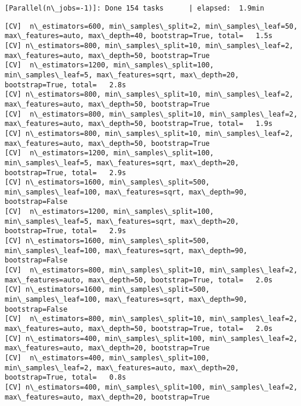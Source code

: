 \documentclass[11pt]{article}
\begin{document}
\begin{Verbatim}[commandchars=\\\{\}]
    \end{Verbatim}

    \begin{Verbatim}[commandchars=\\\{\}]
[Parallel(n\_jobs=-1)]: Done 154 tasks      | elapsed:  1.9min

    \end{Verbatim}

    \begin{Verbatim}[commandchars=\\\{\}]
[CV]  n\_estimators=600, min\_samples\_split=2, min\_samples\_leaf=50, max\_features=auto, max\_depth=40, bootstrap=True, total=   1.5s
[CV] n\_estimators=800, min\_samples\_split=10, min\_samples\_leaf=2, max\_features=auto, max\_depth=50, bootstrap=True 
[CV]  n\_estimators=1200, min\_samples\_split=100, min\_samples\_leaf=5, max\_features=sqrt, max\_depth=20, bootstrap=True, total=   2.8s
[CV] n\_estimators=800, min\_samples\_split=10, min\_samples\_leaf=2, max\_features=auto, max\_depth=50, bootstrap=True 
[CV]  n\_estimators=800, min\_samples\_split=10, min\_samples\_leaf=2, max\_features=auto, max\_depth=50, bootstrap=True, total=   1.9s
[CV] n\_estimators=800, min\_samples\_split=10, min\_samples\_leaf=2, max\_features=auto, max\_depth=50, bootstrap=True 
[CV]  n\_estimators=1200, min\_samples\_split=100, min\_samples\_leaf=5, max\_features=sqrt, max\_depth=20, bootstrap=True, total=   2.9s
[CV] n\_estimators=1600, min\_samples\_split=500, min\_samples\_leaf=100, max\_features=sqrt, max\_depth=90, bootstrap=False 
[CV]  n\_estimators=1200, min\_samples\_split=100, min\_samples\_leaf=5, max\_features=sqrt, max\_depth=20, bootstrap=True, total=   2.9s
[CV] n\_estimators=1600, min\_samples\_split=500, min\_samples\_leaf=100, max\_features=sqrt, max\_depth=90, bootstrap=False 
[CV]  n\_estimators=800, min\_samples\_split=10, min\_samples\_leaf=2, max\_features=auto, max\_depth=50, bootstrap=True, total=   2.0s
[CV] n\_estimators=1600, min\_samples\_split=500, min\_samples\_leaf=100, max\_features=sqrt, max\_depth=90, bootstrap=False 
[CV]  n\_estimators=800, min\_samples\_split=10, min\_samples\_leaf=2, max\_features=auto, max\_depth=50, bootstrap=True, total=   2.0s
[CV] n\_estimators=400, min\_samples\_split=100, min\_samples\_leaf=2, max\_features=auto, max\_depth=20, bootstrap=True 
[CV]  n\_estimators=400, min\_samples\_split=100, min\_samples\_leaf=2, max\_features=auto, max\_depth=20, bootstrap=True, total=   0.8s
[CV] n\_estimators=400, min\_samples\_split=100, min\_samples\_leaf=2, max\_features=auto, max\_depth=20, bootstrap=True 

\end{Verbatim}
\end{document}
